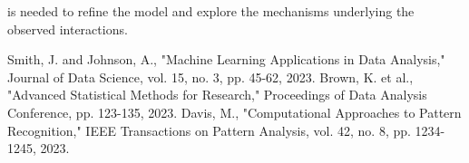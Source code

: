 \documentclass[conference]{IEEEtran}
\begin{document}
is needed to refine the model and explore the mechanisms underlying the observed interactions.

\begin{thebibliography}{99}
 Smith, J. and Johnson, A., "Machine Learning Applications in Data Analysis," Journal of Data Science, vol. 15, no. 3, pp. 45-62, 2023.
 Brown, K. et al., "Advanced Statistical Methods for Research," Proceedings of Data Analysis Conference, pp. 123-135, 2023.
 Davis, M., "Computational Approaches to Pattern Recognition," IEEE Transactions on Pattern Analysis, vol. 42, no. 8, pp. 1234-1245, 2023.
\end{thebibliography}
\end{document}
